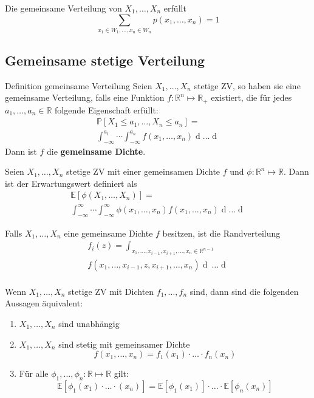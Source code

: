 \documentclass[a4paper,10pt]{article}
\def\R{\mathbb{R}}
\def\P{\mathbb{P}}
\def\E{\mathbb{E}}
\begin{document}
Die gemeinsame Verteilung von \(X_1, \ldots, X_n\) erfüllt
\[\sum_{x_1\in W_1, \ldots, x_n \in W_n} p(x_1, \ldots, x_n) = 1\]


\subsection{Gemeinsame stetige Verteilung}

\begin{subbox}{Definition gemeinsame Verteilung}
	Seien \(X_1, \ldots, X_n\) stetige ZV, so haben sie eine gemeinsame Verteilung, falls eine Funktion \(f: \R^n \mapsto \R_+\) existiert, die für jedes \(a_1, \ldots, a_n \in \R\) folgende Eigenschaft erfüllt:
	\begin{multline*}
		\P[X_1 \le a_1, \ldots, X_n \le a_n] = \\
        \int_{-\infty}^{a_1} \cdots \int_{-\infty}^{a_n} f(x_1, \ldots, x_n) \mathop{dx_n} \ldots \mathop{dx_1}
	\end{multline*}
	Dann ist \(f\) die \textbf{gemeinsame Dichte}.
\end{subbox}

Seien \(X_1, \ldots, X_n\) stetige ZV mit einer gemeinsamen Dichte \(f\) und \(\phi: \R^n \mapsto \R\). Dann ist der Erwartungswert definiert als
\begin{multline*}
	\E[\phi(X_1, \ldots, X_n)] = \\
    \int_{-\infty}^\infty \cdots \int_{-\infty}^\infty \phi(x_1, \ldots, x_n) f(x_1, \ldots, x_n) \mathop{dx_n} \ldots \mathop{dx_1}
\end{multline*}

Falls \(X_1, \ldots, X_n\) eine gemeinsame Dichte \(f\) besitzen, ist die Randverteilung
\begin{multline*}
	f_i(z) = \int_{x_1, \ldots, x_{i-1}, x_{i+1}, \ldots, x_n \in \R^{n-1}}               \\
	f(x_1, \ldots, x_{i-1}, z, x_{i+1}, \ldots, x_n) \mathop{dx_n} \ \ldots \mathop{dx_1} \\
\end{multline*}

Wenn \(X_1, \ldots, X_n\) stetige ZV mit Dichten \(f_1, \ldots, f_n\) sind, dann sind die folgenden Aussagen äquivalent:
\begin{enumerate}
	\item \(X_1, \ldots, X_n\) sind unabhängig
	\item \(X_1, \ldots, X_n\) sind stetig mit gemeinsamer Dichte
	      \[f(x_1, \ldots, x_n) = f_1(x_1) \cdot \ldots \cdot f_n(x_n)\]
	\item Für alle \(\phi_1, \ldots, \phi_n: \R \mapsto \R\) gilt:
	      \[\E[\phi_1 (x_1)\cdot \ldots\cdot (x_n)] = \E[\phi_1(x_1)] \cdot \ldots \cdot \E[\phi_n(x_n)]\]
\end{enumerate}
\end{document}
